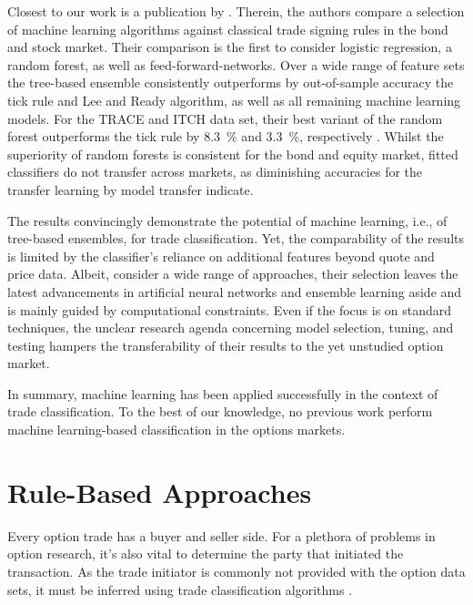 Closest to our work is a publication by \textcite[1--58]{ronenMachineLearningTrade2022}. Therein, the authors compare a selection of machine learning algorithms against classical trade signing rules in the bond and stock market. Their comparison is the first to consider logistic regression, a random forest, as well as \glspl{feed-forward-network}. Over a wide range of feature sets the tree-based ensemble consistently outperforms by out-of-sample accuracy the tick rule and Lee and Ready algorithm, as well as all remaining machine learning models. For the \gls{TRACE} and ITCH data set, their best variant of the random forest outperforms the tick rule by \SI{8.3}{\percent} and \SI{3.3}{\percent}, respectively \autocite[57]{ronenMachineLearningTrade2022}. Whilst the superiority of random forests is consistent for the bond and equity market, fitted classifiers do not transfer across markets, as diminishing accuracies for the transfer learning by model transfer indicate.

The results convincingly demonstrate the potential of machine learning, i.e., of tree-based ensembles, for trade classification. Yet, the comparability of the results is limited by the classifier's reliance on additional features beyond quote and price data. Albeit, \textcite[4]{ronenMachineLearningTrade2022} consider a wide range of approaches, their selection leaves the latest advancements in artificial neural networks and ensemble learning aside and is mainly guided by computational constraints. Even if the focus is on standard techniques, the unclear research agenda concerning model selection, tuning, and testing hampers the transferability of their results to the yet unstudied option market.

In summary, machine learning has been applied successfully in the context of trade classification. To the best of our knowledge, no previous work perform machine learning-based classification in the options markets.

\newpage
\section{Rule-Based Approaches}\label{sec:rule-based-approaches}

Every option trade has a buyer and seller side. For a plethora of problems in option research, it's also vital to determine the party that initiated the transaction. As the trade initiator is commonly not provided with the option data sets, it must be inferred using trade classification algorithms \autocite[][453]{easleyOptionVolumeStock1998}.

